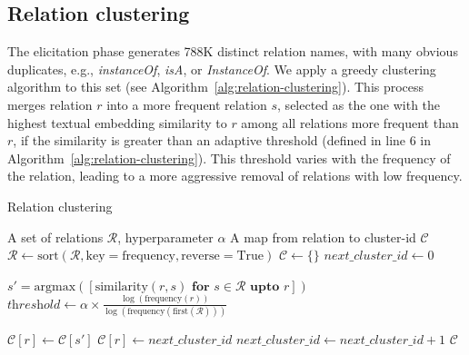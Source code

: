 \subsection{Relation clustering}
The elicitation phase
generates
788K
distinct relation names, with many obvious duplicates, e.g., \textit{instanceOf}, \textit{isA}, or \textit{InstanceOf}. 
We apply a greedy clustering algorithm to this set (see Algorithm~\ref{alg:relation-clustering}).
This process merges relation $r$ into a more frequent relation $s$, selected as the one with the highest textual embedding similarity to $r$ among all relations more frequent than $r$, if the similarity is greater than an adaptive threshold (defined in line 6 in Algorithm~\ref{alg:relation-clustering}).
This
threshold varies with the frequency of the relation, leading to a more aggressive removal of relations 
with low frequency. 

\vspace{-0.1cm}
\begin{algorithm}[ht]
\small
\caption{Relation clustering}\label{alg:relation-clustering}
\begin{algorithmic}[1]
\Require A set of relations $\mathcal{R}$, hyperparameter $\alpha$
\Ensure A map from relation to cluster-id $\mathcal{C}$
\State $\mathcal{R} \gets \text{sort}(\mathcal{R}, \text{key} = \text{frequency}, \text{reverse} = \text{True})$ 
\State $\mathcal{C} \gets \{\}$
\State $\textit{next\_cluster\_id} \gets 0$
    
    \State $s' = \text{argmax}([\text{similarity}(r, s) \textbf{ for } s \in \mathcal{R} \textbf{ upto } r])$
    \State $\textit{threshold} \gets \alpha \times \frac{\log(\text{frequency}(r))}{\log(\text{frequency}(\text{first}(\mathcal{R})))}$

        \State $\mathcal{C}[r] \gets \mathcal{C}[s']$
    \Else
        \State $\mathcal{C}[r] \gets \textit{next\_cluster\_id}$ 
        \State $\textit{next\_cluster\_id} \gets \textit{next\_cluster\_id} + 1$
    \EndIf
\EndFor
\State \Return $\mathcal{C}$
\end{algorithmic}
\end{algorithm}
\vspace{-0.1cm}


